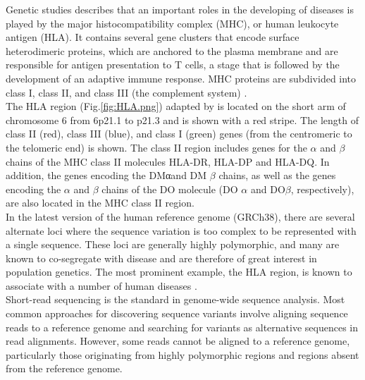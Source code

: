 
Genetic studies describes that an important roles in the developing of diseases is played by the major histocompatibility complex (MHC), or human leukocyte antigen (HLA). It contains several gene clusters that encode surface heterodimeric proteins, which are anchored to the plasma membrane and are responsible for antigen presentation to T cells, a stage that is followed by the development of an adaptive immune response. MHC proteins are subdivided into class I, class II, and class III (the complement system) \cite{campbell1993map}. \\



The HLA region (Fig.\ref{fig:HLA.png}) adapted by \cite{zakharova2019contribution} is located on the short arm of chromosome 6 from 6p21.1 to p21.3 and is shown with a red stripe. The length of class II (red), class III (blue), and class I (green) genes (from the centromeric to the telomeric end) is shown. The class II region includes genes for the {\ensuremath{\alpha}} and {\ensuremath{\beta}} chains of the MHC class II molecules HLA-DR, HLA-DP and HLA-DQ. In addition, the genes encoding the DMαand DM {\ensuremath{\beta}} chains, as well as the genes encoding the {\ensuremath{\alpha}} and {\ensuremath{\beta}} chains of the DO molecule (DO {\ensuremath{\alpha}} and DO{\ensuremath{\beta}}, respectively), are also located in the MHC class II region.\\




In the latest version \cite{eggertsson2017graphtyper} of the human reference genome (GRCh38), there are several alternate loci where the sequence variation is too complex to be represented with a single sequence. These loci are generally highly polymorphic, and many are known to co-segregate with disease and are therefore of great interest in population genetics. The most prominent example, the HLA region, is known to associate with a number of human diseases \cite{tiwari2012hla}. \\

Short-read sequencing is the standard in genome-wide sequence analysis. Most common approaches for discovering sequence variants involve aligning sequence reads to a reference genome \cite{li2009fast} and searching for variants as alternative sequences in read alignments. However, some reads cannot be aligned to a reference genome, particularly those originating from highly polymorphic regions and regions absent from the reference genome.